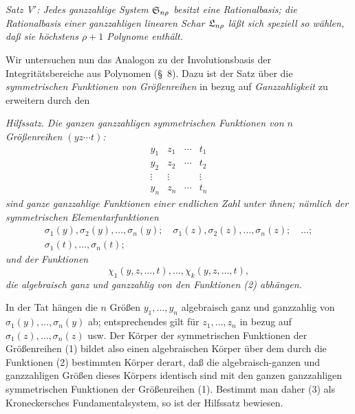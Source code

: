 \emph{Satz V$'$: Jedes ganzzahlige System $\mathfrak{S}_{n\rho}$ besitzt eine Rationalbasis; die Rationalbasis einer ganzzahligen linearen Schar $\mathfrak{L}_{n\rho}$ läßt sich speziell so wählen, daß sie höchstens $\rho+1$ Polynome enthält.}

Wir untersuchen nun das Analogon zu der Involutionsbasis der Integritätsbereiche aus Polynomen (\S\ 8). Dazu ist der Satz über die \emph{symmetrischen Funktionen von Größenreihen} in bezug auf \emph{Ganzzahligkeit} zu erweitern durch den

\emph{Hilfssatz. Die ganzen ganzzahligen symmetrischen Funktionen von $n$ Größenreihen $(yz\cdots t)$:}
\begin{equation}
\begin{array}{cccc}
  y_1&z_1&\cdots&t_1\\
  y_2&z_2&\cdots&t_2\\
  \vdots&\vdots&&\vdots\\
  y_n&z_n&\cdots&t_n
\end{array}
\tag{1}
\end{equation}
\emph{sind ganze ganzzahlige Funktionen einer endlichen Zahl unter ihnen; nämlich der symmetrischen Elementarfunktionen}
\begin{equation}
\begin{gathered}
  \sigma_1(y),\sigma_2(y),\ldots,\sigma_n(y);\quad
  \sigma_1(z),\sigma_2(z),\ldots,\sigma_n(z);\quad\ldots;\\
  \sigma_1(t),\ldots,\sigma_n(t);
\end{gathered}
\tag{2}
\end{equation}
\emph{und der Funktionen}
\begin{equation}
  \chi_1(y,z,\ldots,t),\ldots,\chi_k(y,z,\ldots,t),
\tag{3}
\end{equation}
\emph{die algebraisch ganz und ganzzahlig von den Funktionen (2) abhängen.}

In der Tat hängen die $n$ Größen $y_1,
\ldots,y_n$ algebraisch ganz und ganzzahlig von $\sigma_1(y),
\ldots,\sigma_n(y)$ ab; entsprechendes gilt für $z_1,
\ldots,z_n$ in bezug auf $\sigma_1(z),
\ldots,\sigma_n(z)$ usw. Der Körper der symmetrischen Funktionen der Größenreihen (1) bildet also einen algebraischen Körper über dem durch die Funktionen (2) bestimmten Körper derart, daß die algebraisch-ganzen und ganzzahligen Größen dieses Körpers identisch sind mit den ganzen ganzzahligen symmetrischen Funktionen der Größenreihen (1). Bestimmt man daher (3) als Kroneckersches Fundamentalsystem, so ist der Hilfssatz bewiesen.

